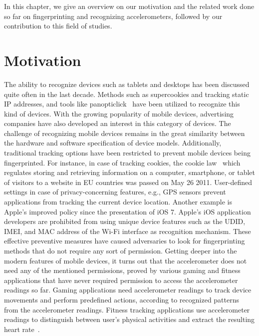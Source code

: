 
In this chapter, we give an overview on our motivation and the related work done so far on fingerprinting and recognizing accelerometers, followed by our contribution to this field of studies. 

\section{Motivation}
\label{ch:motivation}
The ability to recognize devices such as tablets and desktops has been discussed quite often in the last decade. Methods such as supercookies and tracking static IP addresses, and tools like panopticlick~\cite{eckersley2010unique} have been utilized to recognize this kind of devices. With the growing popularity of mobile devices, advertising companies have also developed an interest in this category of devices. The challenge of recognizing mobile devices remains in the great similarity between the hardware and software specification of device models. Additionally, traditional tracking options have been restricted to prevent mobile devices being fingerprinted. For instance, in case of tracking cookies, the cookie law~\cite{CookieLaw} which regulates storing and retrieving information on a computer, smartphone, or tablet of visitors to a website in EU countries was passed on May 26 2011. User-defined settings in case of privacy-concerning features, e.g., GPS sensors prevent applications from tracking the current device location. Another example is Apple's improved policy since the presentation of iOS 7. Apple's iOS application developers are prohibited from using unique device features such as the \ac{UDID}, \ac{IMEI}, and \ac{MAC} address of the Wi-Fi interface as recognition mechanism. These effective preventive measures have caused adversaries to look for fingerprinting methods that do not require any sort of permission. Getting deeper into the modern features of mobile devices, it turns out that the accelerometer does not need any of the mentioned permissions, proved by various gaming and fitness applications that have never required permission to access the accelerometer readings so far. Gaming applications need accelerometer readings to track device movements and perform predefined actions, according to recognized patterns from the accelerometer readings. Fitness tracking applications use accelerometer readings to distinguish between user's physical activities and extract the resulting heart rate~\cite{kwon2011validation}.
